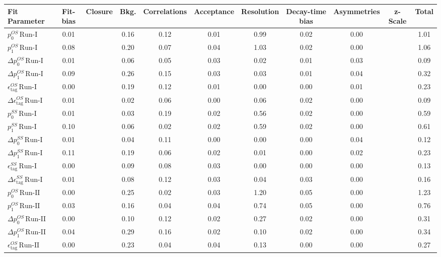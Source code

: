 \begin{tabular}{l  c  c  c  c  c  c  c  c  c  | c }
\hline
\hline
Fit Parameter & Fit-bias & Closure & Bkg. & Correlations & Acceptance & Resolution & Decay-time bias & Asymmetries & z-Scale &  Total  \\ 
\hline
$p_{0}^{OS} \, \text{Run-I}$ & 0.01 &  & 0.16 & 0.12 & 0.01 & 0.99 & 0.02 & 0.00 &  & 1.01 \\ 
$p_{1}^{OS} \, \text{Run-I}$ & 0.08 &  & 0.20 & 0.07 & 0.04 & 1.03 & 0.02 & 0.00 &  & 1.06 \\ 
$\Delta p_{0}^{OS} \, \text{Run-I}$ & 0.01 &  & 0.06 & 0.05 & 0.03 & 0.02 & 0.01 & 0.03 &  & 0.09 \\ 
$\Delta p_{1}^{OS} \, \text{Run-I}$ & 0.09 &  & 0.26 & 0.15 & 0.03 & 0.03 & 0.01 & 0.04 &  & 0.32 \\ 
$\epsilon_{\text{tag}}^{OS} \, \text{Run-I}$ & 0.00 &  & 0.19 & 0.12 & 0.01 & 0.00 & 0.00 & 0.01 &  & 0.23 \\ 
$\Delta \epsilon_{\text{tag}}^{OS} \, \text{Run-I}$ & 0.01 &  & 0.02 & 0.06 & 0.00 & 0.06 & 0.02 & 0.00 &  & 0.09 \\ 
$p_{0}^{SS} \, \text{Run-I}$ & 0.01 &  & 0.03 & 0.19 & 0.02 & 0.56 & 0.02 & 0.00 &  & 0.59 \\ 
$p_{1}^{SS} \, \text{Run-I}$ & 0.10 &  & 0.06 & 0.02 & 0.02 & 0.59 & 0.02 & 0.00 &  & 0.61 \\ 
$\Delta p_{0}^{SS} \, \text{Run-I}$ & 0.01 &  & 0.04 & 0.11 & 0.00 & 0.00 & 0.00 & 0.04 &  & 0.12 \\ 
$\Delta p_{1}^{SS} \, \text{Run-I}$ & 0.11 &  & 0.19 & 0.06 & 0.02 & 0.01 & 0.00 & 0.02 &  & 0.23 \\ 
$\epsilon_{\text{tag}}^{SS} \, \text{Run-I}$ & 0.00 &  & 0.09 & 0.08 & 0.03 & 0.00 & 0.00 & 0.00 &  & 0.13 \\ 
$\Delta \epsilon_{\text{tag}}^{SS} \, \text{Run-I}$ & 0.01 &  & 0.08 & 0.12 & 0.03 & 0.04 & 0.03 & 0.00 &  & 0.16 \\ 
$p_{0}^{OS} \, \text{Run-II}$ & 0.00 &  & 0.25 & 0.02 & 0.03 & 1.20 & 0.05 & 0.00 &  & 1.23 \\ 
$p_{1}^{OS} \, \text{Run-II}$ & 0.03 &  & 0.16 & 0.04 & 0.04 & 0.74 & 0.05 & 0.00 &  & 0.76 \\ 
$\Delta p_{0}^{OS} \, \text{Run-II}$ & 0.00 &  & 0.10 & 0.12 & 0.02 & 0.27 & 0.02 & 0.00 &  & 0.31 \\ 
$\Delta p_{1}^{OS} \, \text{Run-II}$ & 0.04 &  & 0.29 & 0.16 & 0.02 & 0.10 & 0.02 & 0.00 &  & 0.34 \\ 
$\epsilon_{\text{tag}}^{OS} \, \text{Run-II}$ & 0.00 &  & 0.23 & 0.04 & 0.04 & 0.13 & 0.00 & 0.00 &  & 0.27 \\ 

\end{tabular}
